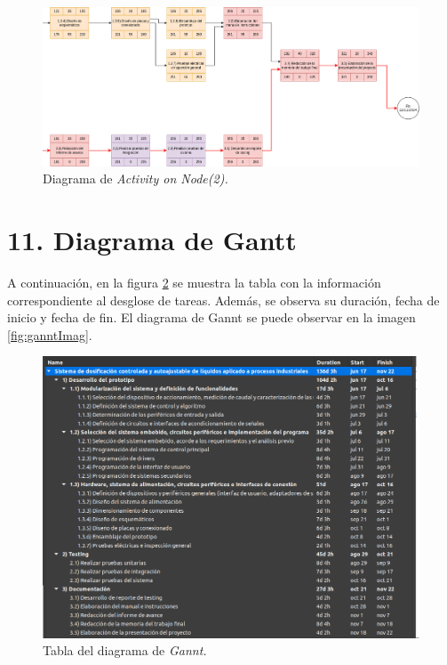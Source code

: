 \documentclass[
11pt, %
]{charter}
\begin{document}
\begin{landscape}
\begin{figure}[htpb]
\vspace{55px}
\centering 
\includegraphics[height=.6\textheight]{./Figuras/actOnNode2.png}
\caption{Diagrama de \textit{Activity on Node(2).}}
\label{fig:actOnNode2}
\end{figure}
\end{landscape}


\section{11. Diagrama de Gantt}
\label{sec:gantt}

A continuación, en la figura \ref{fig:ganntTable} se muestra la tabla con la información correspondiente al desglose de tareas. Además, se observa su duración, fecha de inicio y fecha de fin. El diagrama de Gannt se puede observar en la imagen \ref{fig:ganntImag}.



\begin{figure}[htpb]
\vspace{55px}
\centering 
\includegraphics[height=.5\textheight]{./Figuras/ganntTable.png}
\caption{Tabla del diagrama de \textit{Gannt.}}
\label{fig:ganntTable}
\end{figure}
\end{document}
